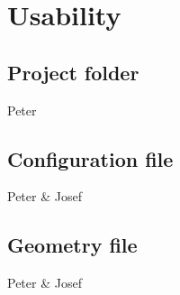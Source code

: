 \chapter{Usability} %
\label{cha:usability}

\section{Project folder} %
\label{sec:project_folder}

Peter


\section{Configuration file} %
\label{sec:configuration_file}

Peter \& Josef


\section{Geometry file} %
\label{sec:geometry_file}

Peter \& Josef


